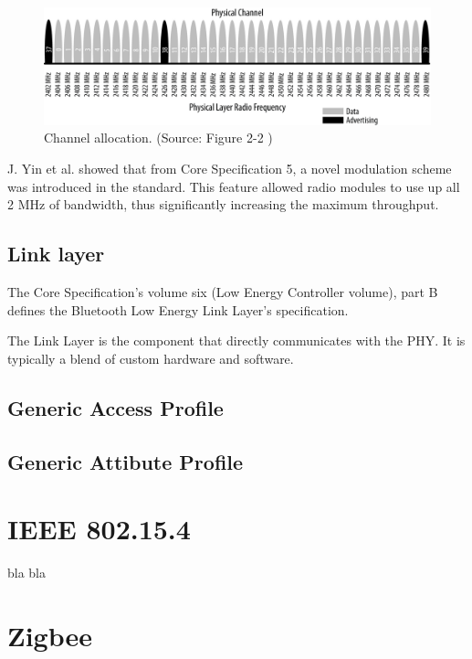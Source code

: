 \begin{figure}[!ht]
    \centering
    \includegraphics[width=150mm, keepaspectratio]{figures/ble_phy.png}
    \caption{Channel allocation. (Source: Figure 2-2 \cite{Townsend14})}
    \label{fig:ble_phy}
\end{figure}

J. Yin et al. \cite{Yin:19} showed that from Core Specification 5, a novel
modulation scheme was introduced in the standard.
This feature allowed radio modules to use up all 2 MHz of bandwidth,
thus significantly increasing the maximum throughput.

\subsection{Link layer}
\label{ble:link}
The Core Specification's volume six (Low Energy Controller volume),
part B defines the Bluetooth Low Energy Link Layer's specification.

The Link Layer is the component that directly communicates with the PHY.
It is typically a blend of custom hardware and software. \cite{Townsend14}


\subsection{Generic Access Profile}
\label{ble:gap}

\subsection{Generic Attibute Profile}
\label{ble:gatt}

\section{IEEE 802.15.4}
\label{sec:15_4}

bla bla

\section{Zigbee}
\label{sec:zig}

